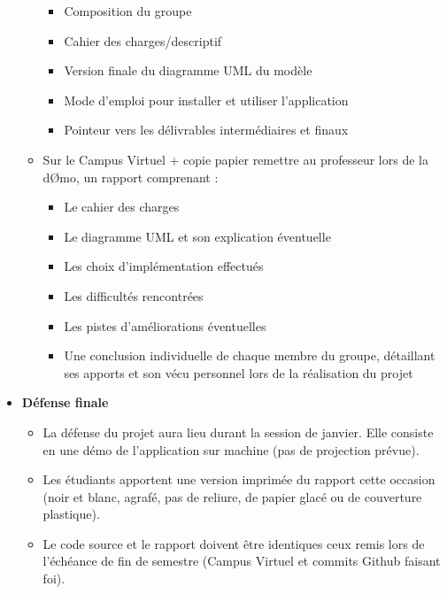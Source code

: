 \begin{itemize}
\begin{itemize}
         \begin{itemize}
             \item Composition du groupe
             \item Cahier des charges/descriptif
             \item Version finale du diagramme UML du modèle
             \item Mode d’emploi pour installer et utiliser l’application
             \item Pointeur vers les délivrables intermédiaires et finaux
         \end{itemize}
         \clearpage
         \item Sur le Campus Virtuel + copie papier remettre au professeur lors de la dØmo, un rapport comprenant :
         \begin{itemize}
             \item Le cahier des charges
             \item Le diagramme UML et son explication éventuelle
             \item Les choix d’implémentation effectués
             \item Les difficultés rencontrées
             \item Les pistes d’améliorations éventuelles
             \item Une conclusion individuelle de chaque membre du groupe, détaillant ses apports et son vécu personnel lors de la réalisation du projet
         \end{itemize}
     \end{itemize}
     \item \textbf{Défense finale}
     \begin{itemize}
         \item La défense du projet aura lieu durant la session de janvier. Elle consiste en une démo de l’application sur machine (pas de projection prévue).
         \item Les étudiants apportent une version imprimée du rapport cette occasion (noir et blanc, agrafé, pas de reliure, de papier glacé ou de couverture plastique).
         \item Le code source et le rapport doivent être identiques ceux remis lors de l’échéance de fin de semestre (Campus Virtuel et commits Github faisant foi).
     \end{itemize}
\end{itemize}


